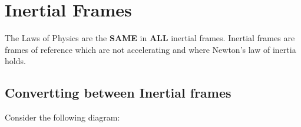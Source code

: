 \section{Inertial Frames}

The Laws of Physics are the {\bf SAME} in {\bf ALL} inertial frames. Inertial frames are frames of reference which are not accelerating and where Newton's law of inertia holds.

\subsection{Convertting between Inertial frames}
Consider the following diagram:

\begin{mycenter}


	\begin{tikzpicture}[x=0.75pt,y=0.75pt,yscale=-1,xscale=1]


\end{tikzpicture}
\end{mycenter}

